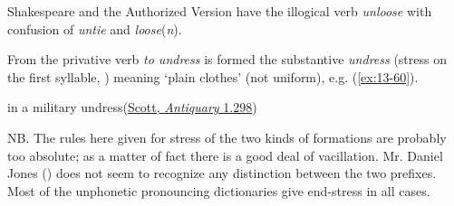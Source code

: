Shakespeare and the Authorized Version have the illogical verb \textit{unloose} with confusion of \textit{untie} and \textit{loose}(\textit{n}). %

From the privative verb \textit{to undress} is formed the substantive \textit{undress} (stress on the first syllable, \cite[175 \S5.72]{jespersenMEG1}) %
meaning `plain clothes' (not uniform), e.g. (\ref{ex:13-60}).

\ea \label{ex:13-60} in a military undress\hfill(\href{https://archive.org/details/cewaverleynovels03scotuoft/page/174/mode/2up?view=theater&q=%22undress%22}{Scott, \textit{Antiquary} 1.298}) %
\z

NB. The rules here given for stress of the two kinds of formations are probably too absolute; as a matter of fact there is a good deal of vacillation. Mr. Daniel Jones (\citeyear[488]{jones1917everyman}) %
does not seem to recognize any distinction between the two prefixes. Most of the unphonetic pronouncing dictionaries give end-stress in all cases.

